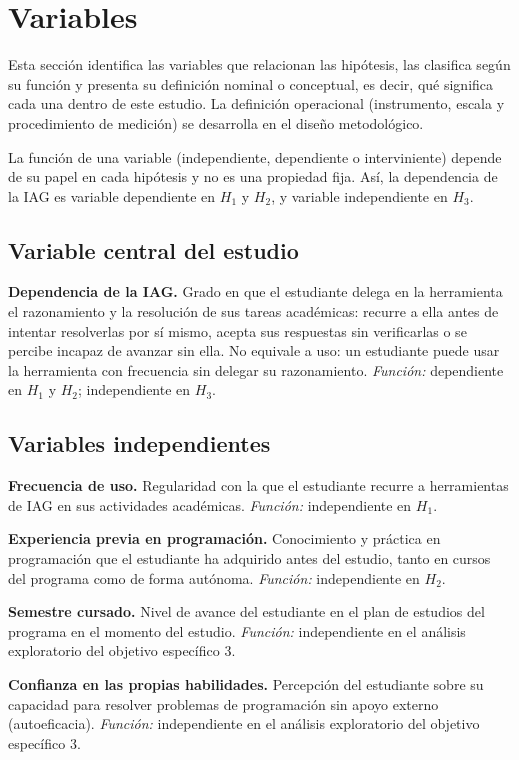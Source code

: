 \documentclass[12pt,letterpaper]{article}
\begin{document}
\section{Variables}

Esta sección identifica las variables que relacionan las hipótesis, las clasifica según su función y presenta su definición nominal o conceptual, es decir, qué significa cada una dentro de este estudio. La definición operacional (instrumento, escala y procedimiento de medición) se desarrolla en el diseño metodológico.

La función de una variable (independiente, dependiente o interviniente) depende de su papel en cada hipótesis y no es una propiedad fija. Así, la dependencia de la IAG es variable dependiente en $H_1$ y $H_2$, y variable independiente en $H_3$.

\subsection{Variable central del estudio}

\textbf{Dependencia de la IAG.} Grado en que el estudiante delega en la herramienta el razonamiento y la resolución de sus tareas académicas: recurre a ella antes de intentar resolverlas por sí mismo, acepta sus respuestas sin verificarlas o se percibe incapaz de avanzar sin ella. No equivale a uso: un estudiante puede usar la herramienta con frecuencia sin delegar su razonamiento. \emph{Función:} dependiente en $H_1$ y $H_2$; independiente en $H_3$.

\subsection{Variables independientes}

\textbf{Frecuencia de uso.} Regularidad con la que el estudiante recurre a herramientas de IAG en sus actividades académicas. \emph{Función:} independiente en $H_1$.

\textbf{Experiencia previa en programación.} Conocimiento y práctica en programación que el estudiante ha adquirido antes del estudio, tanto en cursos del programa como de forma autónoma. \emph{Función:} independiente en $H_2$.

\textbf{Semestre cursado.} Nivel de avance del estudiante en el plan de estudios del programa en el momento del estudio. \emph{Función:} independiente en el análisis exploratorio del objetivo específico 3.

\textbf{Confianza en las propias habilidades.} Percepción del estudiante sobre su capacidad para resolver problemas de programación sin apoyo externo (autoeficacia). \emph{Función:} independiente en el análisis exploratorio del objetivo específico 3.
\end{document}
